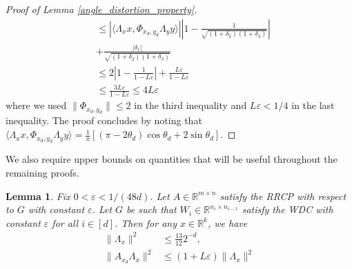 \documentclass[11pt]{article}
\renewcommand{\epsilon}{\varepsilon}
\newcommand{\R}{\mathbb{R}}
\newcommand{\G}{G}
\newtheorem{lem}{Lemma}
\theoremstyle{remark}
\begin{document}
\begin{proof}[Proof of Lemma \ref{angle_distortion_property}]
\begin{align*}
& \leqslant \left|\langle \Lambda_x x, \Phi_{x_d,y_d}\Lambda_y y \rangle\right| \left|1 - \frac{1}{\sqrt{\left(1 + \delta_2\right)\left( 1 + \delta_3\right)}}\right| \\
& + \frac{|\delta_1|}{\sqrt{\left(1 + \delta_2\right)\left( 1 + \delta_3\right)}} \\
& \leqslant 2\left|1 - \frac{1}{1 - L\epsilon}\right| + \frac{L\epsilon}{1 - L\epsilon} \\
& \leqslant \frac{3L\epsilon}{1 - L\epsilon} \leqslant 4L\epsilon
\end{align*} where we used $\|\Phi_{x_d,y_d}\| \leqslant 2$ in the third inequality and $L\epsilon < 1/4$ in the last inequality. The proof concludes by noting that $\langle \Lambda_x x, \Phi_{x_d,y_d}\Lambda_y y \rangle = \frac{1}{\pi}[(\pi - 2\theta_d)\cos \theta_d + 2\sin\theta_d].
$
\end{proof}

We also require upper bounds on quantities that will be useful throughout the remaining proofs.

\begin{lem} \label{upper_bounds_on_lambda_Az} Fix $0 < \epsilon < 1/(48d)$. Let $A \in \R^{m \times n}$ satisfy the RRCP with respect to $\G$ with constant $\epsilon$. Let $\G$ be such that $W_{i} \in \R^{n_i \times n_{i-1}}$ satisfy the WDC with constant $\epsilon$ for all $i \in [d]$. Then for any $x \in \R^k$, we have \begin{align}
    \|\Lambda_x\|^2 & \leqslant \frac{13}{12}2^{-d}, \label{bound_on_lambda_energy} \\
    \|A_{x_d}\Lambda_x\|^2 & \leqslant (1 + L\epsilon)\|\Lambda_x\|^2 \label{bound_on_AxdLambdax}
\end{align}

\end{lem}
\end{document}
